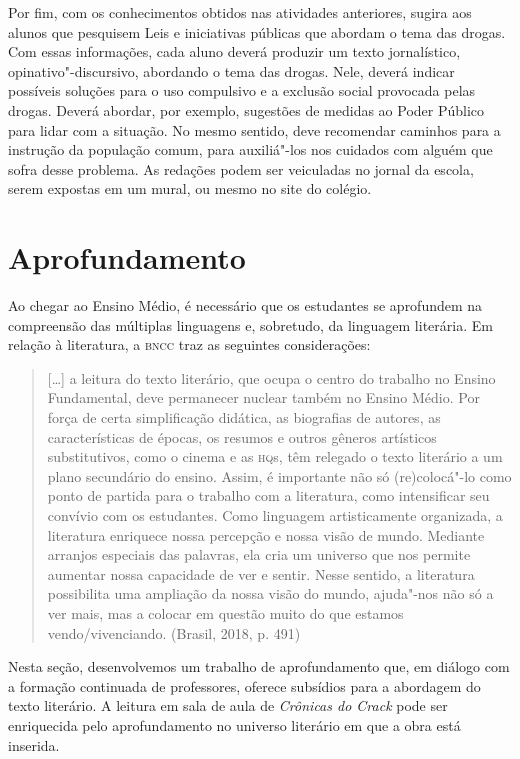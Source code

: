 \documentclass{article}
\begin{document}
Por fim, com os conhecimentos obtidos nas atividades
anteriores, sugira aos alunos que pesquisem Leis e iniciativas públicas
que abordam o tema das drogas. Com essas informações, cada aluno deverá
produzir um texto jornalístico, opinativo"-discursivo, abordando o tema
das drogas. Nele, deverá indicar possíveis soluções para o uso
compulsivo e a exclusão social provocada pelas drogas. Deverá abordar,
por exemplo, sugestões de medidas ao Poder Público para lidar com a
situação. No mesmo sentido, deve recomendar caminhos para a instrução da
população comum, para auxiliá"-los nos cuidados com alguém que sofra
desse problema. As redações podem ser veiculadas no jornal da escola,
serem expostas em um mural, ou mesmo no site do colégio.

\section{Aprofundamento}

Ao chegar ao Ensino Médio, é necessário que os estudantes se aprofundem
na compreensão das múltiplas linguagens e, sobretudo, da linguagem
literária. Em relação à literatura, a \textsc{bncc} traz as seguintes
considerações:

\begin{quote}
{[}\ldots{]} a leitura do texto literário, que ocupa o centro do trabalho
no Ensino Fundamental, deve permanecer nuclear também no Ensino Médio.
Por força de certa simplificação didática, as biografias de autores, as
características de épocas, os resumos e outros gêneros artísticos
substitutivos, como o cinema e as \textsc{hq}s, têm relegado o texto literário a
um plano secundário do ensino. Assim, é importante não só (re)colocá"-lo
como ponto de partida para o trabalho com a literatura, como
intensificar seu convívio com os estudantes. Como linguagem
artisticamente organizada, a literatura enriquece nossa percepção e
nossa visão de mundo. Mediante arranjos especiais das palavras, ela cria
um universo que nos permite aumentar nossa capacidade de ver e sentir.
Nesse sentido, a literatura possibilita uma ampliação da nossa visão do
mundo, ajuda"-nos não só a ver mais, mas a colocar em questão muito do
que estamos vendo/vivenciando. (Brasil, 2018, p. 491)
\end{quote}

Nesta seção, desenvolvemos um trabalho de aprofundamento que, em diálogo
com a formação continuada de professores, oferece subsídios para a
abordagem do texto literário. A leitura em sala de aula de
\emph{Crônicas do Crack} pode ser enriquecida pelo aprofundamento no
universo literário em que a obra está inserida.
\end{document}
